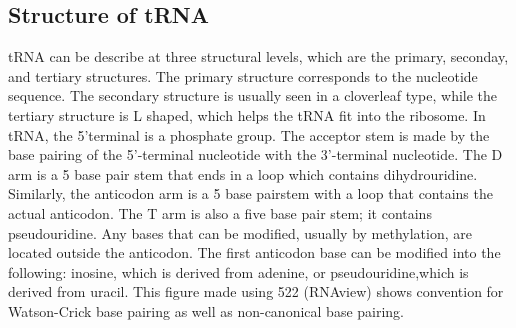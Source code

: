 \documentclass[pdftex, 12pt]{article}
\begin{document}
\subsection{Structure of tRNA} 
tRNA can be describe at three structural levels, which are the primary, seconday, and tertiary structures. The primary structure corresponds to the nucleotide sequence. The secondary structure is usually seen in a cloverleaf type, while the tertiary structure is L shaped, which helps the tRNA  fit into the ribosome. In tRNA, the 5'terminal is a phosphate group. The acceptor stem is made by the base pairing of the 5'-terminal nucleotide with the 3'-terminal nucleotide. The D arm is a 5  base pair stem that ends in a loop which contains dihydrouridine. Similarly, the anticodon arm is a 5 base pairstem with a loop that contains the actual anticodon. The T arm is also a five base pair stem; it contains pseudouridine. Any bases that can be modified, usually by methylation, are located outside the anticodon. The first anticodon base can be modified into the following: inosine, which is derived from adenine, or pseudouridine,which is derived from uracil. This figure made using 522 (RNAview) shows convention for Watson-Crick base pairing as well as non-canonical base pairing. 
\end{document}

